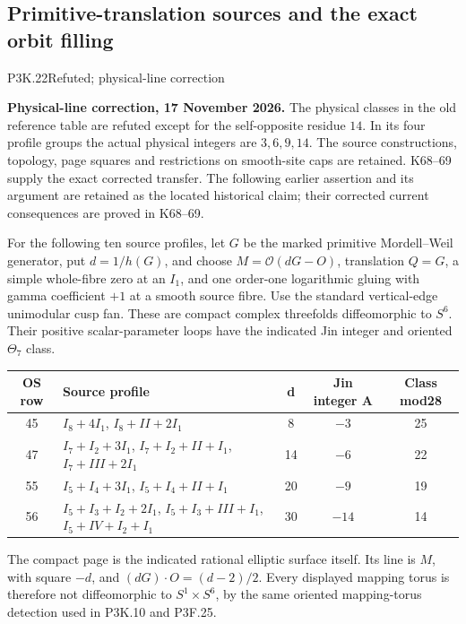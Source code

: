 \subsection{Primitive-translation sources and the exact orbit filling}

\begin{statement}{P3K.22}{Refuted; physical-line correction}\par\noindent\textbf{Physical-line correction, 17 November 2026.} The physical classes in the old reference table are refuted except for the self-opposite residue \(14\). In its four profile groups the actual physical integers are \(3,6,9,14\). The source constructions, topology, page squares and restrictions on smooth-site caps are retained. K68--69 supply the exact corrected transfer. The following earlier assertion and its argument are retained as the located historical claim; their corrected current consequences are proved in K68--69.\medskip\par 
For the following ten source profiles, let \(G\) be the marked
primitive Mordell--Weil generator, put \(d=1/h(G)\), and choose
\(M=\mathcal O(dG-O)\), translation \(Q=G\), a simple whole-fibre
zero at an \(I_1\), and one order-one logarithmic gluing with gamma
coefficient \(+1\) at a smooth source fibre.  Use the standard
vertical-edge unimodular cusp fan.  These are compact complex
threefolds diffeomorphic to \(S^6\).  Their positive scalar-parameter
loops have the indicated Jin integer and oriented \(\Theta_7\) class.


\begin{center}\small\begin{tabular}{c p{} c c c}\hline
OS row & Source profile & d & Jin integer A & Class mod28 \\
\hline
45 & \(I_8+4I_1\), \(I_8+II+2I_1\) & 8 & \(-3\) & 25 \\
47 & \(I_7+I_2+3I_1\), \(I_7+I_2+II+I_1\), \(I_7+III+2I_1\) & 14 & \(-6\) & 22 \\
55 & \(I_5+I_4+3I_1\), \(I_5+I_4+II+I_1\) & 20 & \(-9\) & 19 \\
56 & \(I_5+I_3+I_2+2I_1\), \(I_5+I_3+III+I_1\), \(I_5+IV+I_2+I_1\) & 30 & \(-14\) & 14 \\
\hline\end{tabular}\end{center}

The compact page is the indicated rational elliptic surface itself.
Its line is \(M\), with square \(-d\), and
\((dG)\cdot O=(d-2)/2\).  Every displayed mapping torus is therefore
not diffeomorphic to \(S^1\times S^6\), by the same oriented
mapping-torus detection used in P3K.10 and P3F.25.


\end{statement}

